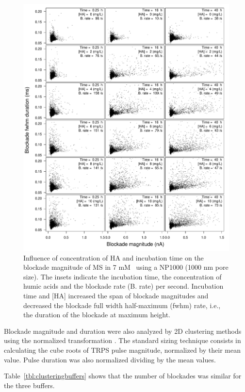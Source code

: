 \documentclass[journal=langd5,manuscript=article]{achemso}
\begin{document}
 \begin{figure}
  \includegraphics[width=\linewidth]{Figures/Scattering_MS_HA_D2_detail.pdf}
  \caption{Influence of concentration of HA and incubation time on the blockade magnitude of MS in 7 mM~ using a NP1000 (1000 nm pore size). The insets indicate the incubation time, the concentration of humic acids and the blockade rate (B. rate) per second. Incubation time and [HA] increased the span of blockade magnitudes and decreased the blockade full  width half-maximum (fwhm) rate, i.e., the duration of the blockade at maximum height.}
\label{fgr:blockades}
\end{figure}

Blockade magnitude and duration were also analyzed  by 2D clustering methods using the normalized transformation \cite{Weatherall2016,VogelQuantitativeSizing2011}. The  standard sizing technique consists in calculating the cube roots of TRPS pulse magnitude, normalized by their mean value. Pulse duration was also normalized  dividing by the mean values.

Table~\ref{tbl:clusteringbuffers} shows that the number of blockades was similar for the three buffers.
\end{document}
